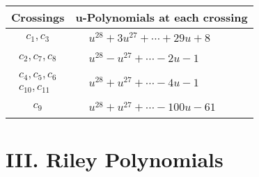 \documentclass[1p]{elsarticle_modified}
\theoremstyle{definition}
\begin{document}
\begin{tabular}{m{50pt}|m{274pt}}
Crossings & \hspace{64pt}u-Polynomials at each crossing \\
\hline $$\begin{aligned}c_{1},c_{3}\end{aligned}$$&$\begin{aligned}
&u^{28}+3 u^{27}+\cdots+29 u+8
\end{aligned}$\\
\hline $$\begin{aligned}c_{2},c_{7},c_{8}\end{aligned}$$&$\begin{aligned}
&u^{28}- u^{27}+\cdots-2 u-1
\end{aligned}$\\
\hline $$\begin{aligned}c_{4},c_{5},c_{6}\\c_{10},c_{11}\end{aligned}$$&$\begin{aligned}
&u^{28}+u^{27}+\cdots-4 u-1
\end{aligned}$\\
\hline $$\begin{aligned}c_{9}\end{aligned}$$&$\begin{aligned}
&u^{28}+u^{27}+\cdots-100 u-61
\end{aligned}$\\
\hline
\end{tabular}\newpage\renewcommand{\arraystretch}{1}
\centering \section*{ III. Riley Polynomials}
\end{document}
